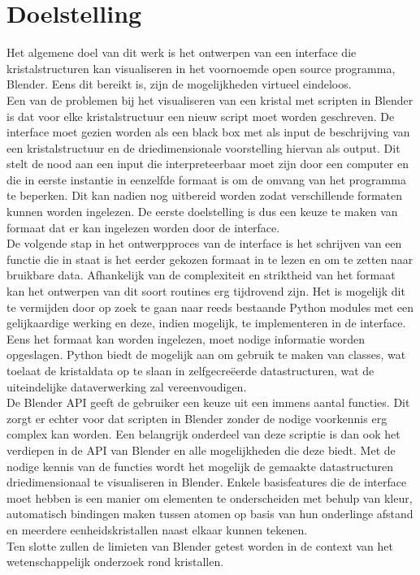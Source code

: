 \section{Doelstelling}
Het algemene doel van dit werk is het ontwerpen van een interface die kristalstructuren kan visualiseren in het voornoemde open source programma, Blender. Eens dit bereikt is, zijn de mogelijkheden virtueel eindeloos. 
\\
Een van de problemen bij het visualiseren van een kristal met scripten in Blender is dat voor elke kristalstructuur een nieuw script moet worden geschreven. De interface moet gezien worden als een black box met als input de beschrijving van een kristalstructuur en de driedimensionale voorstelling hiervan als output. Dit stelt de nood aan een input die interpreteerbaar moet zijn door een computer en die in eerste instantie in eenzelfde formaat is om de omvang van het programma te beperken. Dit kan nadien nog uitbereid worden zodat verschillende formaten kunnen worden ingelezen. De eerste doelstelling is dus een keuze te maken van formaat dat er kan ingelezen worden door de interface.  
\\
De volgende stap in het ontwerpproces van de interface is het schrijven van een functie die in staat is het eerder gekozen formaat in te lezen en om te zetten naar bruikbare data. Afhankelijk van de complexiteit en striktheid van het formaat kan het ontwerpen van dit soort routines erg tijdrovend zijn. Het is mogelijk dit te vermijden door op zoek te gaan naar reeds bestaande Python modules met een gelijkaardige werking en deze, indien mogelijk, te implementeren in de interface. Eens het formaat kan worden ingelezen, moet nodige informatie worden opgeslagen. Python biedt de mogelijk aan om gebruik te maken van classes, wat toelaat de kristaldata op te slaan in zelfgecreëerde datastructuren, wat de uiteindelijke dataverwerking zal vereenvoudigen. 
\\
De Blender API geeft de gebruiker een keuze uit een immens aantal functies. Dit zorgt er echter voor dat scripten in Blender zonder de nodige voorkennis erg complex kan worden. Een belangrijk onderdeel van deze scriptie is dan ook het verdiepen in de API van Blender en alle mogelijkheden die deze biedt. Met de nodige kennis van de functies wordt het mogelijk de gemaakte datastructuren driedimensionaal te visualiseren in Blender. Enkele basisfeatures die de interface moet hebben is een manier om elementen te onderscheiden met behulp van kleur, automatisch bindingen maken tussen atomen op basis van hun onderlinge afstand en meerdere eenheidskristallen naast elkaar kunnen tekenen.
\\
Ten slotte zullen de limieten van Blender getest worden in de context van het wetenschappelijk onderzoek rond kristallen.  


